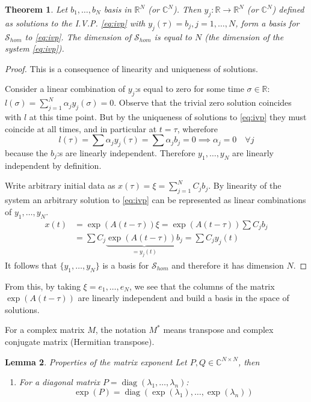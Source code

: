 \documentclass{article}
\newtheorem{theorem}{Theorem}
\newtheorem{lemma}[theorem]{Lemma}
\DeclareMathOperator{\diag}{diag}
\begin{document}
\begin{theorem}
	Let $b_1, \ldots, b_N$ basis in $\mathbb R^N$ (or $\mathbb C^N$).
	Then $y_j : \mathbb R \to \mathbb R^N$ (or $\mathbb C^N$)
	defined as solutions to the I.V.P. \eqref{eq:ivp}
	with $y_j(\tau) = b_j, j = 1, \ldots, N$,
	form a basis for $\mathcal S_{hom}$ to \eqref{eq:ivp}.
	The dimension of $\mathcal S_{hom}$ is equal to $N$
	(the dimension of the system \eqref{eq:ivp}).
\end{theorem}
\begin{proof}
	This is a consequence of linearity and uniqueness of solutions.

	Consider a linear combination of $y_j$:s
	equal to zero for some time $\sigma \in \mathbb R$:
	$l(\sigma) = \sum_{j=1}^N \alpha_j y_j(\sigma) = 0$.
	Observe that the trivial zero solution coincides with $l$ at this time point.
	But by the uniqueness of solutions to \eqref{eq:ivp}
	they must coincide at all times, and in particular at $t = \tau$, wherefore
	$$ l(\tau) = \sum \alpha_j y_j(\tau) = \sum \alpha_j b_j = 0 \implies \alpha_j = 0 \quad \forall j$$
	because the $b_j$:s are linearly independent.
	Therefore $y_1, \ldots, y_N$ are linearly independent by definition.

	Write arbitrary initial data as $x(\tau) = \xi = \sum_{j=1}^N C_j b_j$.
	By linearity of the system an arbitrary solution to \eqref{eq:ivp}
	can be represented as linear combinations of $y_1, \ldots, y_N$.
	\begin{align*}
		x(t) &= \exp(A(t-\tau))\xi = \exp(A(t-\tau)) \sum C_j b_j \\
		&= \sum C_j \underbrace{\exp(A(t-\tau)) b_j}_{= y_j(t)} = \sum C_j y_j(t)
	\end{align*}
	It follows that $\{y_1,\ldots,y_N\}$ is a basis for $\mathcal S_{hom}$
	and therefore it has dimension $N$.
\end{proof}

From this, by taking $\xi = e_1, \ldots, e_N$, we see that the
columns of the matrix $\exp(A (t - \tau))$ are linearly independent
and build a basis in the space of solutions.

For a complex matrix $M$, the notation $M^*$ means
transpose and complex conjugate matrix (Hermitian transpose).
\begin{lemma}{Properties of the matrix exponent}
	Let $P, Q \in \mathbb C^{N \times N}$, then
	\begin{enumerate}
		\item For a diagonal matrix $P = \diag(\lambda_1, \ldots, \lambda_n)$:
			$$ \exp(P) = \diag(\exp(\lambda_1), \ldots, \exp(\lambda_n)) $$
	\end{enumerate}
\end{lemma}
\end{document}
